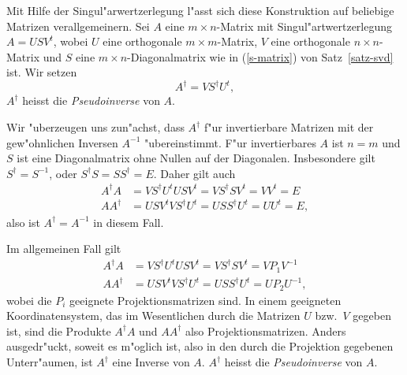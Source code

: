 Mit Hilfe der Singul"arwertzerlegung l"asst sich diese Konstruktion
auf beliebige Matrizen verallgemeinern.
Sei $A$ eine $m\times n$-Matrix mit Singul"artwertzerlegung
$A=USV^t$, wobei $U$ eine orthogonale $m\times m$-Matrix, $V$ eine orthogonale
$n\times n$-Matrix und $S$ eine $m\times n$-Diagonalmatrix wie in (\ref{s-matrix})
von Satz~\ref{satz-svd} ist.
Wir setzen
\begin{equation}
A^\dagger = VS^\dagger U^t,
\label{definition-pseudoinverse}
\end{equation}
$A^\dagger$ heisst die {\em Pseudoinverse} von $A$.

Wir "uberzeugen uns zun"achst, dass $A^\dagger$ f"ur invertierbare Matrizen
mit der gew"ohnlichen Inversen $A^{-1}$ "ubereinstimmt.
F"ur invertierbares $A$ ist $n=m$ und $S$ ist eine Diagonalmatrix ohne Nullen
auf der Diagonalen.
Insbesondere gilt $S^\dagger=S^{-1}$, oder $S^\dagger S=SS^\dagger=E$.
Daher gilt auch
\begin{align*}
A^\dagger A&=VS^\dagger U^tUSV^t=VS^\dagger SV^t=VV^t=E\\
AA^\dagger &=USV^tVS^\dagger U^t=USS^\dagger U^t=UU^t=E,
\end{align*}
also ist $A^\dagger=A^{-1}$ in diesem Fall.

Im allgemeinen Fall gilt
\begin{align*}
A^\dagger A&=VS^\dagger U^tUSV^t=VS^\dagger SV^t=VP_1V^{-1}\\
AA^\dagger &=USV^tVS^\dagger U^t=USS^\dagger U^t=UP_2U^{-1},
\end{align*}
wobei die $P_i$ geeignete Projektionsmatrizen sind.
In einem geeigneten Koordinatensystem, das im Wesentlichen durch die Matrizen
$U$ bzw.~$V$ gegeben ist, sind die Produkte $A^\dagger A$ und $AA^\dagger$
also Projektionsmatrizen.
Anders ausgedr"uckt, soweit es m"oglich ist, also in den durch die Projektion
gegebenen Unterr"aumen, ist $A^\dagger$ eine Inverse von $A$.
$A^\dagger$ heisst die {\em Pseudoinverse} von $A$.


